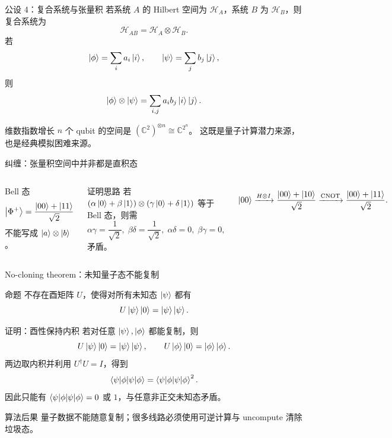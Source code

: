 \documentclass[aspectratio=169,10pt]{ctexbeamer}
\begin{document}
\begin{frame}{公设 4：复合系统与张量积}
若系统 $A$ 的 Hilbert 空间为 $\mathcal H_A$，系统 $B$ 为 $\mathcal H_B$，则复合系统为
\[
\mathcal H_{AB}=\mathcal H_A\otimes\mathcal H_B.
\]
若
\[
\ket\phi=\sum_i a_i\ket{i},\qquad \ket\psi=\sum_j b_j\ket{j},
\]
则
\[
\ket\phi\otimes\ket\psi=\sum_{i,j}a_i b_j\ket{i}\ket{j}.
\]
\begin{keybox}{维数指数增长}
$n$ 个 qubit 的空间是 $(\mathbb C^2)^{\otimes n}\cong\mathbb C^{2^n}$。
这既是量子计算潜力来源，也是经典模拟困难来源。
\end{keybox}
\end{frame}

\begin{frame}{纠缠：张量积空间中并非都是直积态}
\begin{columns}[T,totalwidth=\textwidth]
Bell 态
\[
\ket{\Phi^+}=\frac{\ket{00}+\ket{11}}{\sqrt2}
\]
不能写成 $\ket a\otimes\ket b$。
\begin{exbox}{证明思路}
若 $(\alpha\ket0+\beta\ket1)\otimes(\gamma\ket0+\delta\ket1)$ 等于 Bell 态，则需
\[
\alpha\gamma=\frac1{\sqrt2},\; \beta\delta=\frac1{\sqrt2},\; \alpha\delta=0,
\; \beta\gamma=0,
\]
矛盾。
\end{exbox}
\vspace{3mm}
\[
\ket{00}\xrightarrow{H\otimes I}\frac{\ket{00}+\ket{10}}{\sqrt2}
\xrightarrow{\mathrm{CNOT}}\frac{\ket{00}+\ket{11}}{\sqrt2}.
\]
\end{columns}
\end{frame}


\begin{frame}{No-cloning theorem：未知量子态不能复制}
\small
\begin{keybox}{命题}
不存在酉矩阵 $U$，使得对所有未知态 $\ket\psi$ 都有
\[
U\ket\psi\ket0=\ket\psi\ket\psi.
\]
\end{keybox}
\begin{keybox}{证明：酉性保持内积}
若对任意 $\ket\psi,\ket\phi$ 都能复制，则
\[
U\ket\psi\ket0=\ket\psi\ket\psi,
\qquad
U\ket\phi\ket0=\ket\phi\ket\phi.
\]
两边取内积并利用 $U^{\dagger}U=I$，得到
\[
\braket{\psi|\phi}=\braket{\psi|\phi}^2.
\]
因此只能有 $\braket{\psi|\phi}=0$ 或 $1$，与任意非正交未知态矛盾。
\end{keybox}
\begin{warnbox}{算法后果}
量子数据不能随意复制；很多线路必须使用可逆计算与 uncompute 清除垃圾态。
\end{warnbox}
\end{frame}
\end{document}
